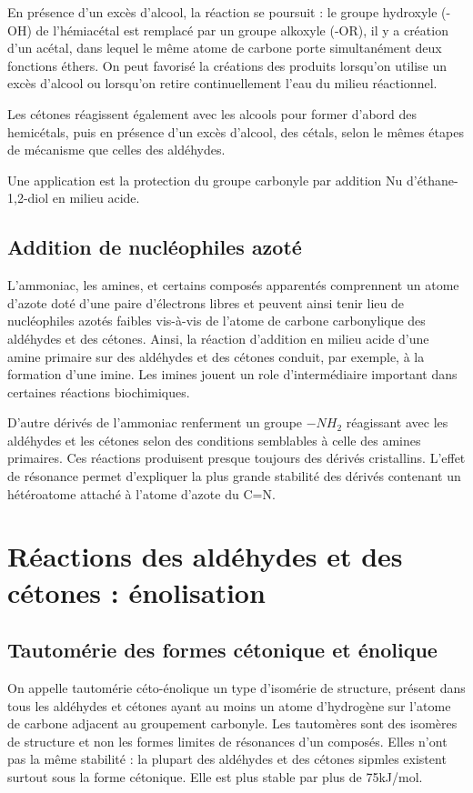 En présence d'un excès d'alcool, la réaction se poursuit : le groupe hydroxyle (-OH) de l'hémiacétal est remplacé par un groupe alkoxyle  (-OR), il y a création d'un acétal, dans lequel le même atome de carbone porte simultanément deux fonctions éthers.
On peut favorisé la créations des produits lorsqu'on  utilise un excès d'alcool ou lorsqu'on retire continuellement l'eau du milieu réactionnel.


Les cétones réagissent également avec les alcools pour former d'abord des hemicétals, puis en présence d'un excès d'alcool, des cétals, selon le mêmes  étapes de mécanisme que celles des aldéhydes.

Une application est la protection du groupe carbonyle par addition Nu d'éthane-1,2-diol en milieu acide.

\subsection{Addition de nucléophiles azoté}

L'ammoniac, les amines, et certains composés apparentés comprennent un atome d'azote doté d'une paire d'électrons libres et peuvent ainsi tenir lieu de nucléophiles azotés faibles vis-à-vis de l'atome de carbone carbonylique des aldéhydes et des cétones.
Ainsi, la réaction d'addition en milieu acide d'une amine primaire sur des aldéhydes et des cétones conduit, par exemple, à la formation d'une imine.
Les imines jouent un role d'intermédiaire important dans certaines réactions biochimiques.

D'autre dérivés de l'ammoniac renferment un groupe $-NH_2$ réagissant avec les aldéhydes et les cétones selon des conditions semblables à celle des amines primaires.
Ces réactions produisent presque toujours des dérivés cristallins.
L'effet de résonance permet d'expliquer la plus grande stabilité des dérivés contenant un hétéroatome attaché à l'atome d'azote du C=N.


\section{Réactions des aldéhydes et des cétones : énolisation}

\subsection{Tautomérie des formes cétonique et énolique}
On appelle tautomérie céto-énolique  un type d'isomérie de structure, présent dans tous les aldéhydes et cétones ayant au moins un atome d'hydrogène sur l'atome de carbone adjacent au groupement carbonyle.
Les tautomères sont des isomères de structure et non les formes limites de résonances d'un composés.
Elles n'ont pas la même stabilité : la plupart des aldéhydes et des cétones sipmles existent surtout sous la forme cétonique.
Elle est plus stable par plus de 75kJ/mol.



